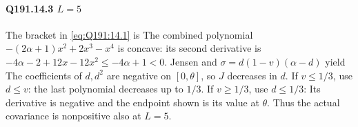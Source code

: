 \paragraph{Q191.14.3 $L=\allowbreak 5$}
The bracket in \eqref{eq:Q191:14.1} is
The combined polynomial $-(2\alpha+1)x^2+2x^3-x^4$ is concave:
its second derivative is $-4\alpha-2+12x-12x^2\le\allowbreak -4\alpha+1<\allowbreak 0$.
Jensen and $\sigma=\allowbreak d(1-v)(\alpha-d)$ yield
The coefficients of $d,\allowbreak d^2$ are negative on $[0,\allowbreak \theta]$, so $J$
decreases in $d$. If $v\le\allowbreak 1/3$, use $d\le\allowbreak  v$:
the last polynomial decreases up to $1/3$. If $v\ge\allowbreak 1/3$, use $d\le\allowbreak 1/3$:
Its derivative is negative and the endpoint shown is its value at $\theta$.
Thus the actual covariance is nonpositive also at $L=\allowbreak 5$.

